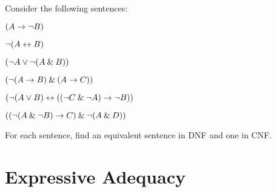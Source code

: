 \begin{practiceproblems}
\problempart
\label{pr.DNF}
Consider the following sentences:
	\begin{earg}
		\item $(A \rightarrow \neg B)$
		\item $\neg (A \leftrightarrow B)$
		\item $(\neg A \vee \neg (A \mathbin{\&} B))$
		\item $(\neg (A \rightarrow B ) \mathbin{\&} (A \rightarrow C))$
		\item $(\neg (A \vee B) \leftrightarrow ((\neg C \mathbin{\&} \neg A) \rightarrow \neg B))$
		\item $((\neg (A \mathbin{\&} \neg B) \rightarrow C) \mathbin{\&} \neg (A \mathbin{\&} D))$
	\end{earg}
For each sentence, find an equivalent sentence in DNF and one in CNF.
\end{practiceproblems}


\chapter{Expressive Adequacy}\label{ch:ExpressiveAdequacy}

